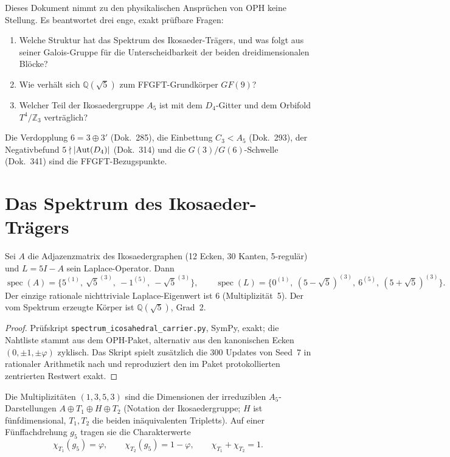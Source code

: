 Dieses Dokument nimmt zu den physikalischen Ansprüchen von OPH keine
Stellung. Es beantwortet drei enge, exakt prüfbare Fragen:
\begin{enumerate}[nosep]
\item Welche Struktur hat das Spektrum des Ikosaeder-Trägers, und was folgt
      aus seiner Galois-Gruppe für die Unterscheidbarkeit der beiden
      dreidimensionalen Blöcke?
\item Wie verhält sich $\mathbb{Q}(\sqrt5)$ zum FFGFT-Grundkörper $GF(9)$?
\item Welcher Teil der Ikosaedergruppe $A_5$ ist mit dem $D_4$-Gitter und
      dem Orbifold $T^4/\mathbb{Z}_3$ verträglich?
\end{enumerate}
Die Verdopplung $6=3\oplus3'$ (Dok.~285), die Einbettung $C_3<A_5$
(Dok.~293), der Negativbefund $5\nmid|{\rm Aut}(D_4)|$ (Dok.~314) und die
$G(3)/G(6)$-Schwelle (Dok.~341) sind die FFGFT-Bezugspunkte.

\section{Das Spektrum des Ikosaeder-Trägers}

\begin{theorem}[Spektrum, \EM/\BM]\label{thm:spektrum}
Sei $A$ die Adjazenzmatrix des Ikosaedergraphen (12 Ecken, 30 Kanten,
5-regulär) und $L=5I-A$ sein Laplace-Operator. Dann
\[
  \operatorname{spec}(A)=\{5^{(1)},\ \sqrt5^{(3)},\ -1^{(5)},\ -\sqrt5^{(3)}\},\qquad
  \operatorname{spec}(L)=\{0^{(1)},\ (5-\sqrt5)^{(3)},\ 6^{(5)},\ (5+\sqrt5)^{(3)}\}.
\]
Der einzige rationale nichttriviale Laplace-Eigenwert ist $6$ (Multiplizität~5).
Der vom Spektrum erzeugte Körper ist $\mathbb{Q}(\sqrt5)$, Grad~2.
\end{theorem}

\begin{proof}
Prüfskript \texttt{spectrum\_icosahedral\_carrier.py}, SymPy, exakt; die
Nahtliste stammt aus dem OPH-Paket, alternativ aus den kanonischen
Ecken $(0,\pm1,\pm\varphi)$ zyklisch. Das Skript spielt zusätzlich die
300 Updates von Seed~7 in rationaler Arithmetik nach und reproduziert den
im Paket protokollierten zentrierten Restwert exakt.
\end{proof}

Die Multiplizitäten $(1,3,5,3)$ sind die Dimensionen der irreduziblen
$A_5$-Darstellungen $A\oplus T_1\oplus H\oplus T_2$ (Notation der
Ikosaedergruppe; $H$ ist fünfdimensional, $T_1,T_2$ die beiden
inäquivalenten Tripletts). Auf einer Fünffachdrehung $g_5$ tragen sie die
Charakterwerte
\[
  \chi_{T_1}(g_5)=\varphi,\qquad \chi_{T_2}(g_5)=1-\varphi,\qquad
  \chi_{T_1}+\chi_{T_2}=1 .
\]

